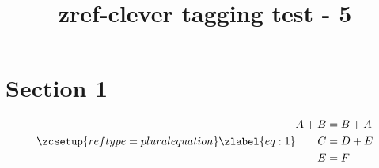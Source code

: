 \documentclass{article}
\title{zref-clever tagging test - 5}
\begin{document}
\section{Section 1}
\begin{equation}
\zcsetup{reftype=pluralequation}
\zlabel{eq:1}
\begin{aligned}
A+B&=B+A\\
C&=D+E\\
E&=F
\end{aligned}
\end{equation}
\end{document}
